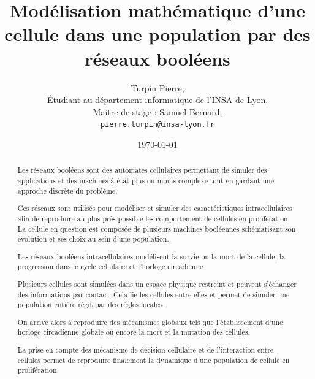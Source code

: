 \documentclass[11pt, a4paper]{article}
\begin{document}
\title{Modélisation mathématique d'une cellule dans une population par des
réseaux booléens}
\author{Turpin Pierre, \\
    Étudiant au département informatique de l'INSA de Lyon, \\
    Maitre de stage : Samuel Bernard, \\
    \texttt{pierre.turpin@insa-lyon.fr}
}
\date{\today}


\maketitle \newpage

\begin{abstract}
    Les réseaux booléens sont des automates cellulaires permettant de simuler
    des applications et des machines à état plus ou moins complexe tout en
    gardant une approche discrète du problème.

    Ces réseaux sont utilisés pour modéliser et simuler des caractéristiques
    intracellulaires afin de reproduire au plus près possible les comportement
    de cellules en prolifération. La cellule en question est composée de
    plusieurs machines booléennes schématisant son évolution et ses choix au
    sein d'une population.

    Les réseaux booléens intracellulaires modélisent la survie ou la mort de la
    cellule, la progression dans le cycle cellulaire et l'horloge circadienne.

    Plusieurs cellules sont simulées dans un espace physique restreint et
    peuvent s'échanger des informations par contact. Cela lie les cellules
    entre elles et permet de simuler une population entière régit par des
    règles locales. %

    On arrive alors à reproduire des mécanismes globaux tels que
    l'établissement d'une horloge circadienne globale ou encore la mort et la
    mutation des cellules.

    La prise en compte des mécanisme de décision cellulaire et de l'interaction
    entre cellules permet de reproduire finalement la dynamique d'une
    population de cellule en prolifération.
\end{abstract} \newpage

\tableofcontents \newpage

\end{document}
